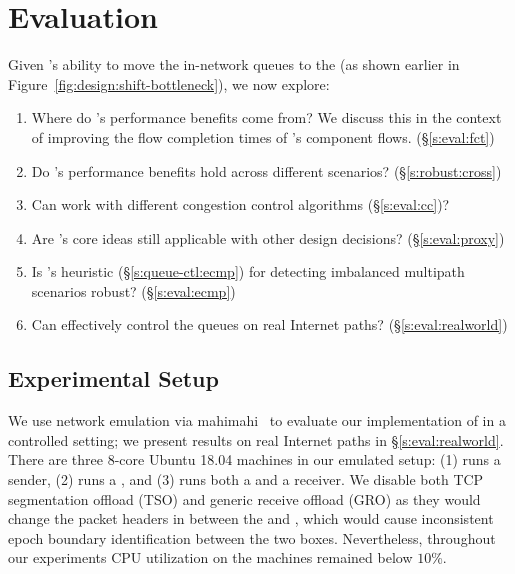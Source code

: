\section{Evaluation}\label{s:eval}

Given \name's ability to move the in-network queues to the \inbox (as shown earlier in Figure~\ref{fig:design:shift-bottleneck}), we now explore:
\begin{enumerate}[leftmargin=15pt]
    \item Where do \name's performance benefits come from? We discuss this in the context of improving the flow completion times of \name's component flows. (\S\ref{s:eval:fct})
    \item Do \name's performance benefits hold across different scenarios? (\S\ref{s:robust:cross})
    \item Can \name work with different congestion control algorithms (\S\ref{s:eval:cc})?
    \item Are \name's core ideas still applicable with other design decisions? (\S\ref{s:eval:proxy})
    \item Is \name's heuristic (\S\ref{s:queue-ctl:ecmp}) for detecting imbalanced multipath scenarios robust? (\S\ref{s:eval:ecmp})  
    \item Can \name effectively control the queues on real Internet paths? (\S\ref{s:eval:realworld})
\end{enumerate}

\subsection{Experimental Setup}\label{s:eval:setup}

We use network emulation via mahimahi~\cite{mahimahi} to evaluate our implementation of \name in a controlled setting; we present results on real Internet paths in \S\ref{s:eval:realworld}.
There are three $8$-core Ubuntu 18.04 machines in our emulated setup: (1) runs a sender, (2) runs a \inbox, and (3) runs both a \outbox and a receiver.
We disable both TCP segmentation offload (TSO) and generic receive offload (GRO) as they would change the packet headers in between the \inbox and \outbox, which would cause inconsistent epoch boundary identification between the two boxes.
Nevertheless, throughout our experiments CPU utilization on the machines remained below $10$\%.

